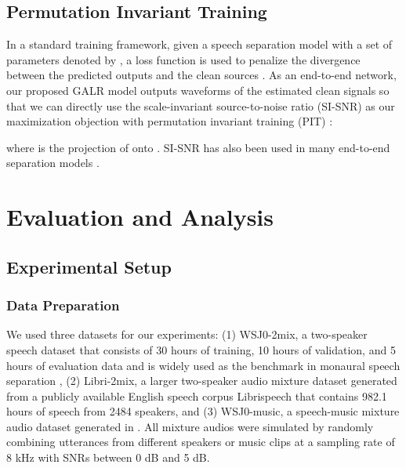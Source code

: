 \documentclass{article}
\begin{document}
\subsection{Permutation Invariant Training}
In a standard training framework, given a speech separation model  with a set of parameters denoted by , a loss function  is used to penalize the divergence between the predicted outputs  and the clean sources . As an end-to-end network, our proposed GALR model  outputs waveforms of the estimated
clean signals so that we can directly use the scale-invariant source-to-noise ratio (SI-SNR) \cite{luo2018tasnet} as our maximization objection with permutation invariant training (PIT) \cite{yu2017permutation, kolbaek2017multitalker}:

where
 is the projection of  onto . SI-SNR has also been used in many end-to-end separation models \cite{luo2018tasnet, luo2019conv, yang2019improved, luo2019dual}.

\section{Evaluation and Analysis}
\label{sec:3}
\subsection{Experimental Setup}

\subsubsection{Data Preparation}
We used three datasets for our experiments: (1) WSJ0-2mix, a two-speaker speech dataset \cite{garofalocontinuous, hershey2016deep} that consists of 30 hours of training, 10 hours of validation, and 5 hours of evaluation data and is widely used as the benchmark in monaural speech separation \cite{luo2019dual, liu2019divide, luo2018tasnet, luo2019conv, wang2018end, zhang2020furcanext, lam2020mixup}, (2) Libri-2mix, a larger two-speaker audio mixture dataset generated from a publicly available English speech corpus Librispeech \cite{panayotov2015librispeech} that contains 982.1 hours of speech from 2484 speakers, and (3) WSJ0-music, a speech-music mixture audio dataset generated in \cite{lam2020mixup}. All mixture audios were simulated by randomly combining utterances from different speakers or music clips at a sampling rate of 8 kHz with SNRs between 0 dB and 5 dB.
\end{document}
